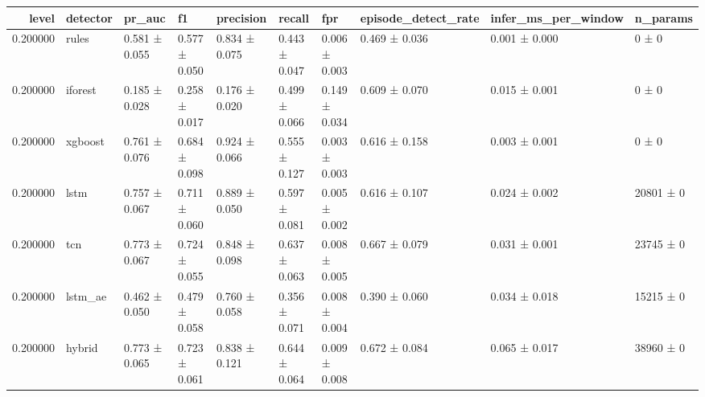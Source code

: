 \begin{tabular}{rlllllllll}
\toprule
level & detector & pr\_auc & f1 & precision & recall & fpr & episode\_detect\_rate & infer\_ms\_per\_window & n\_params \\
\midrule
0.200000 & rules & 0.581 ± 0.055 & 0.577 ± 0.050 & 0.834 ± 0.075 & 0.443 ± 0.047 & 0.006 ± 0.003 & 0.469 ± 0.036 & 0.001 ± 0.000 & 0 ± 0 \\
0.200000 & iforest & 0.185 ± 0.028 & 0.258 ± 0.017 & 0.176 ± 0.020 & 0.499 ± 0.066 & 0.149 ± 0.034 & 0.609 ± 0.070 & 0.015 ± 0.001 & 0 ± 0 \\
0.200000 & xgboost & 0.761 ± 0.076 & 0.684 ± 0.098 & 0.924 ± 0.066 & 0.555 ± 0.127 & 0.003 ± 0.003 & 0.616 ± 0.158 & 0.003 ± 0.001 & 0 ± 0 \\
0.200000 & lstm & 0.757 ± 0.067 & 0.711 ± 0.060 & 0.889 ± 0.050 & 0.597 ± 0.081 & 0.005 ± 0.002 & 0.616 ± 0.107 & 0.024 ± 0.002 & 20801 ± 0 \\
0.200000 & tcn & 0.773 ± 0.067 & 0.724 ± 0.055 & 0.848 ± 0.098 & 0.637 ± 0.063 & 0.008 ± 0.005 & 0.667 ± 0.079 & 0.031 ± 0.001 & 23745 ± 0 \\
0.200000 & lstm\_ae & 0.462 ± 0.050 & 0.479 ± 0.058 & 0.760 ± 0.058 & 0.356 ± 0.071 & 0.008 ± 0.004 & 0.390 ± 0.060 & 0.034 ± 0.018 & 15215 ± 0 \\
0.200000 & hybrid & 0.773 ± 0.065 & 0.723 ± 0.061 & 0.838 ± 0.121 & 0.644 ± 0.064 & 0.009 ± 0.008 & 0.672 ± 0.084 & 0.065 ± 0.017 & 38960 ± 0 \\
\bottomrule
\end{tabular}
